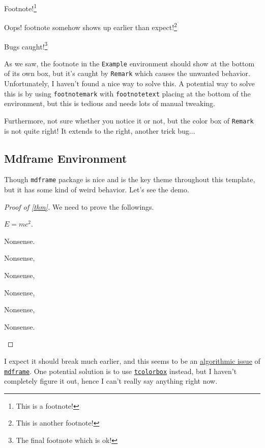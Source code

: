 \begin{eg}
	Footnote!\footnote{This is a footnote!}
	\begin{remark}
		Oops! footnote somehow shows up earlier than expect!\footnote{This is another footnote!}
	\end{remark}

	Bugs caught!\footnote{The final footnote which is ok!}
\end{eg}
\begin{theorem}
	
\end{theorem}

As we saw, the footnote in the \texttt{Example} environment should show at the bottom of its own box, but it's caught by \texttt{Remark} which causes the unwanted behavior. Unfortunately, I haven't found a nice way to solve this. A potential way to solve this is by using \texttt{footnotemark} with \texttt{footnotetext} placing at the bottom of the environment, but this is tedious and needs lots of manual tweaking.

Furthermore, not sure whether you notice it or not, but the color box of \texttt{Remark} is not quite right! It extends to the right, another trick bug...

\subsection{Mdframe Environment}
Though \texttt{mdframe} package is nice and is the key theme throughout this template, but it has some kind of weird behavior. Let's see the demo.

\begin{proof}[Proof of \autoref{thm}]
	We need to prove the followings.
	\begin{claim}
		\(E = mc^{2} \).
	\end{claim}
	\begin{explanation}

		Nonsense.

		Nonsense,

		Nonsense,

		Nonsense,

		Nonsense,

		Nonsense.
	\end{explanation}

\end{proof}

I expect it should break much earlier, and this seems to be an \href{https://github.com/marcodaniel/mdframed/issues/9}{algorithmic issue} of \href{https://ctan.org/pkg/mdframed?lang=en}{\texttt{mdframe}}. One potential solution is to use \href{https://ctan.org/pkg/tcolorbox?lang=en}{\texttt{tcolorbox}} instead, but I haven't completely figure it out, hence I can't really say anything right now.